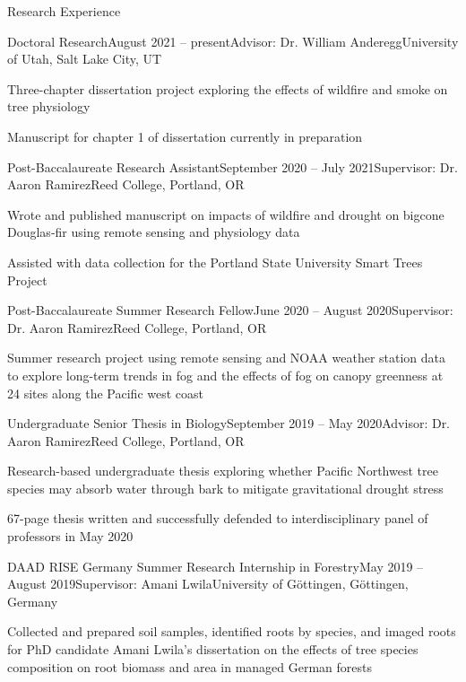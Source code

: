 \documentclass{resume} %
\begin{document}
\begin{rSection}{Research Experience}

\begin{rSubsection}{Doctoral Research}{August 2021 -- present}{Advisor: Dr. William Anderegg}{University of Utah, Salt Lake City, UT}
\item Three-chapter dissertation project exploring the effects of wildfire and smoke on tree physiology 
\item Manuscript for chapter 1 of dissertation currently in preparation
\end{rSubsection}

\begin{rSubsection}{Post-Baccalaureate Research Assistant}{September 2020 -- July 2021}{Supervisor: Dr. Aaron Ramirez}{Reed College, Portland, OR}
\item Wrote and published manuscript on impacts of wildfire and drought on bigcone Douglas-fir using remote sensing and physiology data
\item Assisted with data collection for the Portland State University Smart Trees Project
\end{rSubsection}

\begin{rSubsection}{Post-Baccalaureate Summer Research Fellow}{June 2020 -- August 2020}{Supervisor: Dr. Aaron Ramirez}{Reed College, Portland, OR}
\item Summer research project using remote sensing and NOAA weather station data to explore long-term trends in fog and the effects of fog on canopy greenness at 24 sites along the Pacific west coast
\end{rSubsection}

\begin{rSubsection}{Undergraduate Senior Thesis in Biology}{September 2019 -- May 2020}{Advisor: Dr. Aaron Ramirez}{Reed College, Portland, OR}
\item Research-based undergraduate thesis exploring whether Pacific Northwest tree species may absorb water through bark to mitigate gravitational drought stress
\item 67-page thesis written and successfully defended to interdisciplinary panel of professors in May 2020
\end{rSubsection}


\begin{rSubsection}{DAAD RISE Germany Summer Research Internship in Forestry}{May 2019 -- August 2019}{Supervisor: Amani Lwila}{University of G\"{o}ttingen, G\"{o}ttingen, Germany}
\item Collected and prepared soil samples, identified roots by species, and imaged roots for PhD candidate Amani Lwila's dissertation on the effects of tree species composition on root biomass and area in managed German forests
\end{rSubsection}


\end{rSection}
\end{document}

